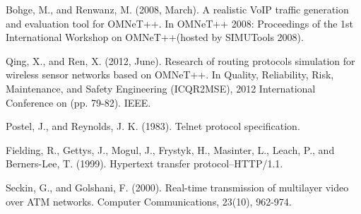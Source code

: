 \documentclass[conference]{IEEEtran}
\begin{document}
\begin{thebibliography}{10}
\bibitem{}
Bohge, M., and Renwanz, M. (2008, March). A realistic VoIP traffic generation 
and evaluation tool for OMNeT++. In OMNeT++ 2008: Proceedings of the 1st 
International Workshop on OMNeT++(hosted by SIMUTools 2008).

\bibitem{}
Qing, X., and Ren, X. (2012, June). Research of routing protocols simulation 
for wireless sensor networks based on OMNeT++. In Quality, Reliability, Risk, 
Maintenance, and Safety Engineering (ICQR2MSE), 2012 International Conference on 
(pp. 79-82). IEEE.

\bibitem{}
Postel, J., and Reynolds, J. K. (1983). Telnet protocol specification.

\bibitem{}
Fielding, R., Gettys, J., Mogul, J., Frystyk, H., Masinter, L., Leach, P., 
and Berners-Lee, T. (1999). Hypertext transfer protocol–HTTP/1.1.

\bibitem{}
Seckin, G., and Golshani, F. (2000). Real-time transmission of multilayer 
video over ATM networks. Computer Communications, 23(10), 962-974.


\end{thebibliography}

%
\end{document}
